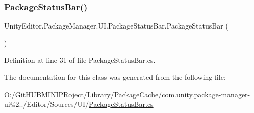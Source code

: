 \subsubsection{\texorpdfstring{PackageStatusBar()}{PackageStatusBar()}}
{\footnotesize\ttfamily Unity\+Editor.\+Package\+Manager.\+U\+I.\+Package\+Status\+Bar.\+Package\+Status\+Bar (\begin{DoxyParamCaption}{ }\end{DoxyParamCaption})}



Definition at line 31 of file Package\+Status\+Bar.\+cs.



The documentation for this class was generated from the following file\+:\begin{DoxyCompactItemize}
\item 
O\+:/\+Git\+H\+U\+B\+M\+I\+N\+I\+P\+Roject/\+Library/\+Package\+Cache/com.\+unity.\+package-\/manager-\/ui@2../\+Editor/\+Sources/\+U\+I/\mbox{\hyperlink{_package_status_bar_8cs}{Package\+Status\+Bar.\+cs}}\end{DoxyCompactItemize}
